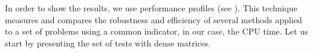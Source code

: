 \documentclass[11pt]{article}
\begin{document}
%


\medskip


In order to show the results, we use performance profiles (see \cite{dolan2002benchmarking}). This technique measures and compares the robustness and efficiency of several methods applied to a set of problems using a common indicator, in our case, the CPU time. %
Let us start by presenting the set of tests with dense matrices.
\end{document}
